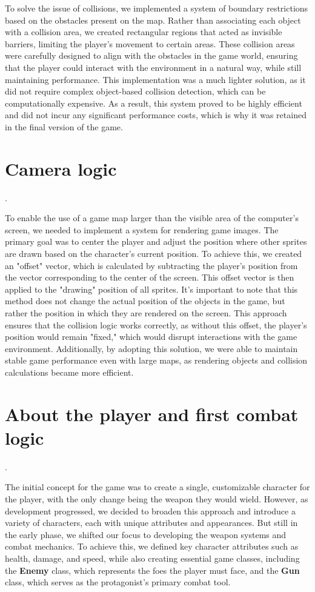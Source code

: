 \documentclass[a4paper,12pt]{article}
\begin{document}
To solve the issue of collisions, we implemented a system of boundary restrictions based on the obstacles present on the map. Rather than associating each object with a collision area, we created rectangular regions that acted as invisible barriers, limiting the player's movement to certain areas. These collision areas were carefully designed to align with the obstacles in the game world, ensuring that the player could interact with the environment in a natural way, while still maintaining performance. This implementation was a much lighter solution, as it did not require complex object-based collision detection, which can be computationally expensive. As a result, this system proved to be highly efficient and did not incur any significant performance costs, which is why it was retained in the final version of the game.

\section*{Camera logic}

.

To enable the use of a game map larger than the visible area of the computer's screen, we needed to implement a system for rendering game images. The primary goal was to center the player and adjust the position where other sprites are drawn based on the character's current position. To achieve this, we created an "offset" vector, which is calculated by subtracting the player's position from the vector corresponding to the center of the screen. This offset vector is then applied to the "drawing" position of all sprites. It's important to note that this method does not change the actual position of the objects in the game, but rather the position in which they are rendered on the screen. This approach ensures that the collision logic works correctly, as without this offset, the player's position would remain "fixed," which would disrupt interactions with the game environment. Additionally, by adopting this solution, we were able to maintain stable game performance even with large maps, as rendering objects and collision calculations became more efficient.

\section*{About the player and first combat logic}
.

The initial concept for the game was to create a single, customizable character for the player, with the only change being the weapon they would wield. However, as development progressed, we decided to broaden this approach and introduce a variety of characters, each with unique attributes and appearances. But still in the early phase, we shifted our focus to developing the weapon systems and combat mechanics. To achieve this, we defined key character attributes such as health, damage, and speed, while also creating essential game classes, including the \textbf{Enemy} class, which represents the foes the player must face, and the \textbf{Gun} class, which serves as the protagonist’s primary combat tool.
\end{document}
